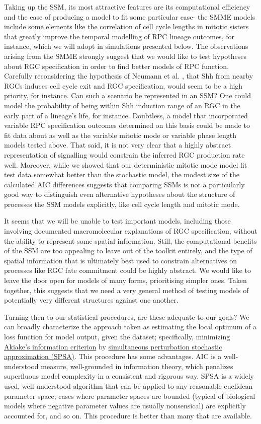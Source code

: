 Taking up the SSM, its most attractive features are its computational efficiency and the ease of producing a model to fit some particular case-  the SMME models include some elements like the correlation of cell cycle lengths in mitotic sisters that greatly improve the temporal modelling of RPC lineage outcomes, for instance, which we will adopt in simulations presented below. The observations arising from the SMME strongly suggest that we would like to test hypotheses about RGC specification in order to find better models of RPC function. Carefully reconsidering the hypothesis of Neumann et al. \cite{Neumann2000}, that Shh from nearby RGCs induces cell cycle exit and RGC specification, would seem to be a high priority, for instance. Can such a scenario be represented in an SSM? One could model the probability of being within Shh induction range of an RGC in the early part of a lineage's life, for instance. Doubtless, a model that incorporated variable RPC specification outcomes determined on this basis could be made to fit data about as well as the variable mitotic mode or variable phase length models tested above. That said, it is not very clear that a highly abstract representation of signalling would constrain the inferred RGC production rate well. Moreover, while we showed that our deterministic mitotic mode model fit test data somewhat better than the stochastic model, the modest size of the calculated AIC differences suggests that comparing SSMs is not a particularly good way to distinguish even alternative hypotheses about the structure of processes the SSM models explicitly, like cell cycle length and mitotic mode. 

It seems that we will be unable to test important models, including those involving documented macromolecular explanations of RGC specification, without the ability to represent some spatial information. Still, the computational benefits of the SSM are too appealing to leave out of the toolkit entirely, and the type of spatial information that is ultimately best used to constrain alternatives on processes like RGC fate commitment could be highly abstract. We would like to leave the door open for models of many forms, prioritising simpler ones. Taken together, this suggests that we need a very general method of testing models of potentially very different structures against one another.

Turning then to our statistical procedures, are these adequate to our goals? We can broadly characterize the approach taken as estimating the local optimum of a loss function for model output, given the dataset; specifically, minimizing \hyperref[ssec:AIC]{Akiake's information criterion} by \hyperref[ssec:SPSA]{simultaneous perturbation stochastic approximation (SPSA)}. This procedure has some advantages. AIC is a well-understood measure, well-grounded in information theory, which penalizes superfluous model complexity in a consistent and rigorous way. SPSA is a widely used, well understood algorithm that can be applied to any reasonable euclidean parameter space; cases where parameter spaces are bounded (typical of biological models where negative parameter values are usually nonsensical) are explicitly accounted for, and so on. This procedure is better than many that are available.

